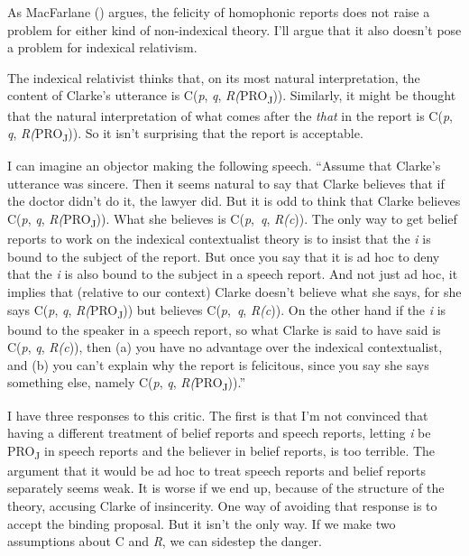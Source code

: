 \documentclass[
  11pt,
  letterpaper,
  DIV=11,
  numbers=noendperiod,
  oneside]{scrartcl}
\begin{document}
As MacFarlane () argues, the
felicity of homophonic reports does not raise a problem for either kind
of non-indexical theory. I'll argue that it also doesn't pose a problem
for indexical relativism.

The indexical relativist thinks that, on its most natural
interpretation, the content of Clarke's utterance is C(\emph{p},
\emph{q}, \emph{R(}PRO\textsubscript{J})). Similarly, it might be
thought that the natural interpretation of what comes after the
\emph{that} in the report is C(\emph{p}, \emph{q},
\emph{R(}PRO\textsubscript{J})). So it isn't surprising that the report
is acceptable.

I can imagine an objector making the following speech. ``Assume that
Clarke's utterance was sincere. Then it seems natural to say that Clarke
believes that if the doctor didn't do it, the lawyer did. But it is odd
to think that Clarke believes C(\emph{p}, \emph{q},
\emph{R(}PRO\textsubscript{J})). What she believes is
C(\emph{p},~\emph{q}, \emph{R(c})). The only way to get belief reports
to work on the indexical contextualist theory is to insist that the
\emph{i} is bound to the subject of the report. But once you say that it
is ad hoc to deny that the \emph{i} is also bound to the subject in a
speech report. And not just ad hoc, it implies that (relative to our
context) Clarke doesn't believe what she says, for she says C(\emph{p},
\emph{q}, \emph{R(}PRO\textsubscript{J})) but believes
C(\emph{p},~\emph{q}, \emph{R(c})). On the other hand if the \emph{i} is
bound to the speaker in a speech report, so what Clarke is said to have
said is C(\emph{p}, \emph{q}, \emph{R(c})), then (a) you have no
advantage over the indexical contextualist, and (b) you can't explain
why the report is felicitous, since you say she says something else,
namely C(\emph{p}, \emph{q}, \emph{R(}PRO\textsubscript{J})).''

I have three responses to this critic. The first is that I'm not
convinced that having a different treatment of belief reports and speech
reports, letting \emph{i} be PRO\textsubscript{J} in speech reports and
the believer in belief reports, is too terrible. The argument that it
would be ad hoc to treat speech reports and belief reports separately
seems weak. It is worse if we end up, because of the structure of the
theory, accusing Clarke of insincerity. One way of avoiding that
response is to accept the binding proposal. But it isn't the only way.
If we make two assumptions about C and \emph{R}, we can sidestep the
danger.
\end{document}

